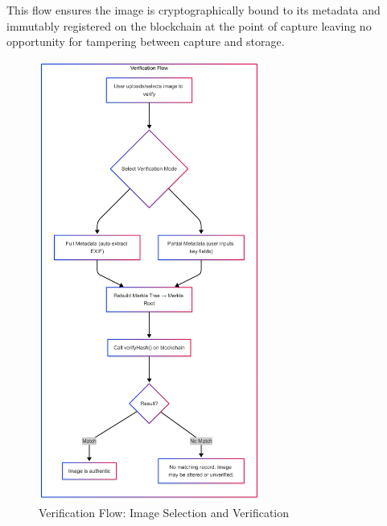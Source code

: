 This flow ensures the image is cryptographically bound to its metadata and immutably registered on the blockchain at the point of capture leaving no opportunity for tampering between capture and storage.

\begin{figure}[ht!]
    \centering
    \includegraphics[width=0.65\textwidth]{images/verifyImageFlow.png}
    \caption{Verification Flow: Image Selection and Verification}
    \label{fig:verificationFlow}
\end{figure}

